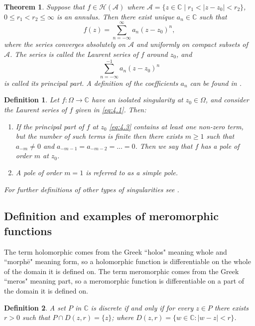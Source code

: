 \documentclass{article}
\newtheorem*{definition}{Definition}
\newtheorem*{theorem}{Theorem}
\begin{document}
\begin{theorem}
Suppose that $f\in\mathcal{H}(\mathcal{A})$ where $\mathcal{A}=\{z\in\mathbb{C}\mid r_{1}<\mid z-z_{0} \mid<r_{2}\}$, $0\leq r_{1} < r_{2} \leq\infty$ is an annulus. Then there exist unique $a_{n}\in\mathbb{C}$ such that 
\[ f(z)=\sum_{n=-\infty}^{\infty} a_{n}(z-z_{0})^{n},\tag{$4.1$}\label{eq:4.1}\]
where the series converges absolutely on $\mathcal{A}$ and uniformly on compact subsets of $\mathcal{A}$. %
The series is called the Laurent series of $f$ around $z_{0}$, and 
\[ \sum_{n=-\infty}^{-1}a_{n}(z-z_{0})^{n}\tag{4.2}\label{eq:4.3} \] is called its principal part. A definition of the coefficients $a_{n}$ can be found in \cite[Chapter~2]{CAaRS}.
\end{theorem}

\begin{definition}
Let $f:\Omega\to\mathbb{C}$ have an isolated singularity at $z_{0}\in\Omega$, and consider the Laurent series of $f$ given in \eqref{eq:4.1}. Then:
\begin{enumerate}[topsep=0pt,itemsep=-1ex,partopsep=1ex,parsep=1ex]
    \item If the principal part of $f$ at $z_{0}$ \eqref{eq:4.3} contains at least one non-zero term, but the number of such terms is finite then there exists $m\geq1$ such that $a_{-m}\neq0$ and $a_{-m-1}=a_{-m-2}=...=0$. Then we say that $f$ has a pole of order $m$ at $z_{0}$.
    \item A pole of order $m=1$ is referred to as a simple pole. 
\end{enumerate}
For further definitions of other types of singularities see \cite[Chapter~6]{CVaA}.
\end{definition}

\subsection*{Definition and examples of meromorphic functions}
The term holomorphic comes from the Greek ``holos" meaning whole and ``morph\=e" meaning form, so a holomorphic function is differentiable on the whole of the domain it is defined on. The term meromorphic comes from the Greek ``meros" meaning part, so a meromorphic function is differentiable on a part of the domain it is defined on.

\begin{definition}
A set $P$ in $\mathbb{C}$ is discrete if and only if for every $z\in P$ there exists $r>0$ such that $P\cap D(z,r)=\{z\}$; where $D(z,r)=\{w\in\mathbb{C}: \mid w-z\mid < r\}$. 
\end{definition}
\end{document}
